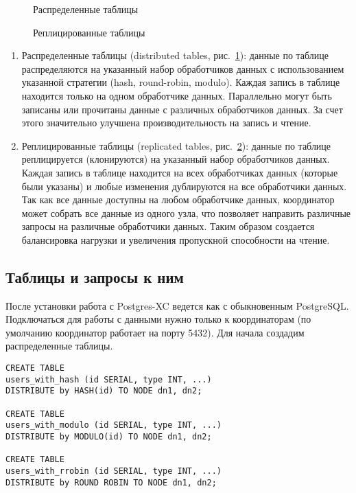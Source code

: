 \begin{figure}[ht!]
  \caption{Распределенные таблицы}
  \label{fig:postgres-xc2}
\end{figure}

\begin{figure}[ht!]
  \caption{Реплицированные таблицы}
  \label{fig:postgres-xc3}
\end{figure}

\begin{enumerate}
  \item Распределенные таблицы (distributed tables, рис.~\ref{fig:postgres-xc2}): данные по таблице распределяются на указанный набор обработчиков данных с использованием указанной стратегии (hash, round-robin, modulo). Каждая запись в таблице находится только на одном обработчике данных. Параллельно могут быть записаны или прочитаны данные с различных обработчиков данных. За счет этого значительно улучшена производительность на запись и чтение.
  \item Реплицированные таблицы (replicated tables, рис.~\ref{fig:postgres-xc3}): данные по таблице реплицируется (клонируются) на указанный набор обработчиков данных. Каждая запись в таблице находится на всех обработчиках данных (которые были указаны) и любые изменения дублируются на все обработчики данных. Так как все данные доступны на любом обработчике данных, координатор может собрать все данные из одного узла, что позволяет направить различные запросы на различные обработчики данных. Таким образом создается балансировка нагрузки и увеличения пропускной способности на чтение.
\end{enumerate}

\subsection{Таблицы и запросы к ним}

После установки работа с Postgres-XC ведется как с обыкновенным PostgreSQL. Подключаться для работы с данными нужно только к координаторам (по умолчанию координатор работает на порту 5432). Для начала создадим распределенные таблицы.

\begin{lstlisting}[label=lst:postgres-xc2,caption=Создание распределенных таблиц]
CREATE TABLE
users_with_hash (id SERIAL, type INT, ...)
DISTRIBUTE by HASH(id) TO NODE dn1, dn2;

CREATE TABLE
users_with_modulo (id SERIAL, type INT, ...)
DISTRIBUTE by MODULO(id) TO NODE dn1, dn2;

CREATE TABLE
users_with_rrobin (id SERIAL, type INT, ...)
DISTRIBUTE by ROUND ROBIN TO NODE dn1, dn2;
\end{lstlisting}

